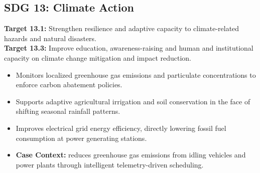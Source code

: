 \subsection{SDG 13: Climate Action}
\noindent\textbf{Target 13.1:} Strengthen resilience and adaptive capacity to climate-related hazards and natural disasters. \\
\noindent\textbf{Target 13.3:} Improve education, awareness-raising and human and institutional capacity on climate change mitigation and impact reduction.
\begin{itemize}
  \item Monitors localized greenhouse gas emissions and particulate concentrations to enforce carbon abatement policies.
  \item Supports adaptive agricultural irrigation and soil conservation in the face of shifting seasonal rainfall patterns.
  \item Improves electrical grid energy efficiency, directly lowering fossil fuel consumption at power generating stations.
  \item \textbf{Case Context:} reduces greenhouse gas emissions from idling vehicles and power plants through intelligent telemetry-driven scheduling.
\end{itemize}
